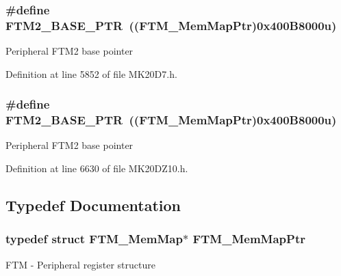 \subsubsection[{\texorpdfstring{F\+T\+M2\+\_\+\+B\+A\+S\+E\+\_\+\+P\+TR}{FTM2_BASE_PTR}}]{\setlength{\rightskip}{0pt plus 5cm}\#define F\+T\+M2\+\_\+\+B\+A\+S\+E\+\_\+\+P\+TR~(({\bf F\+T\+M\+\_\+\+Mem\+Map\+Ptr})0x400\+B8000u)}\hypertarget{group___f_t_m___peripheral_ga897564efeaf1be1f991305d294eda3d6}{}\label{group___f_t_m___peripheral_ga897564efeaf1be1f991305d294eda3d6}
Peripheral F\+T\+M2 base pointer 

Definition at line 5852 of file M\+K20\+D7.\+h.

\subsubsection[{\texorpdfstring{F\+T\+M2\+\_\+\+B\+A\+S\+E\+\_\+\+P\+TR}{FTM2_BASE_PTR}}]{\setlength{\rightskip}{0pt plus 5cm}\#define F\+T\+M2\+\_\+\+B\+A\+S\+E\+\_\+\+P\+TR~(({\bf F\+T\+M\+\_\+\+Mem\+Map\+Ptr})0x400\+B8000u)}\hypertarget{group___f_t_m___peripheral_ga897564efeaf1be1f991305d294eda3d6}{}\label{group___f_t_m___peripheral_ga897564efeaf1be1f991305d294eda3d6}
Peripheral F\+T\+M2 base pointer 

Definition at line 6630 of file M\+K20\+D\+Z10.\+h.



\subsection{Typedef Documentation}
\subsubsection[{\texorpdfstring{F\+T\+M\+\_\+\+Mem\+Map\+Ptr}{FTM_MemMapPtr}}]{\setlength{\rightskip}{0pt plus 5cm}typedef struct {\bf F\+T\+M\+\_\+\+Mem\+Map}$\ast$ {\bf F\+T\+M\+\_\+\+Mem\+Map\+Ptr}}\hypertarget{group___f_t_m___peripheral_gaafa7875c9deb2b3afe4aa22ce6a99d39}{}\label{group___f_t_m___peripheral_gaafa7875c9deb2b3afe4aa22ce6a99d39}
F\+TM -\/ Peripheral register structure 
